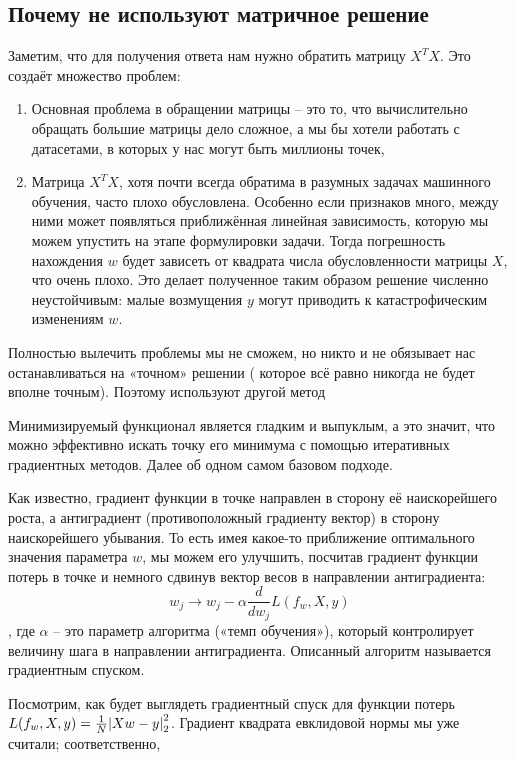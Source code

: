 \subsection{Почему не используют матричное решение}

Заметим, что для получения ответа нам нужно обратить матрицу $X^T X$.
Это создаёт множество проблем:

\begin{enumerate}
    \item Основная проблема в обращении матрицы -- это то, что вычислительно обращать большие матрицы дело
    сложное, а мы бы хотели работать с датасетами, в которых у нас могут быть миллионы точек,
    \item Матрица $X^T X$, хотя почти всегда обратима в разумных задачах машинного обучения, часто плохо обусловлена.
    Особенно если признаков много, между ними может появляться приближённая линейная зависимость, которую мы
    можем упустить на этапе формулировки задачи.
    Тогда погрешность нахождения $w$ будет зависеть от квадрата числа обусловленности матрицы $X$, что очень плохо.
    Это делает полученное таким образом решение численно неустойчивым: малые возмущения $y$ могут приводить к
    катастрофическим изменениям $w$.
\end{enumerate}

Полностью вылечить проблемы мы не сможем, но никто и не обязывает нас останавливаться на «точном» решении (
которое всё равно никогда не будет вполне точным).
Поэтому используют другой метод

Минимизируемый функционал является гладким и выпуклым, а это значит, что можно эффективно искать точку его
минимума с помощью итеративных градиентных методов.
Далее об одном самом базовом подходе.

Как известно, градиент функции в точке направлен в сторону её наискорейшего роста, а антиградиент (противоположный
градиенту вектор) в сторону наискорейшего убывания.
То есть имея какое-то приближение оптимального значения параметра $w$, мы можем его улучшить, посчитав градиент
функции потерь в точке и немного сдвинув вектор весов в направлении антиградиента:
\[ w_j \rightarrow w_j - \alpha \frac{d}{dw_j} L(f_w,X,y) \],
где $\alpha$ -- это параметр алгоритма («темп обучения»), который контролирует величину шага в направлении
антиградиента.
Описанный алгоритм называется градиентным спуском.

Посмотрим, как будет выглядеть градиентный спуск для функции потерь $L(f_w,X,y) = \frac{1}{N} \abs{X w - y}_2^2$.
Градиент квадрата евклидовой нормы мы уже считали; соответственно,

